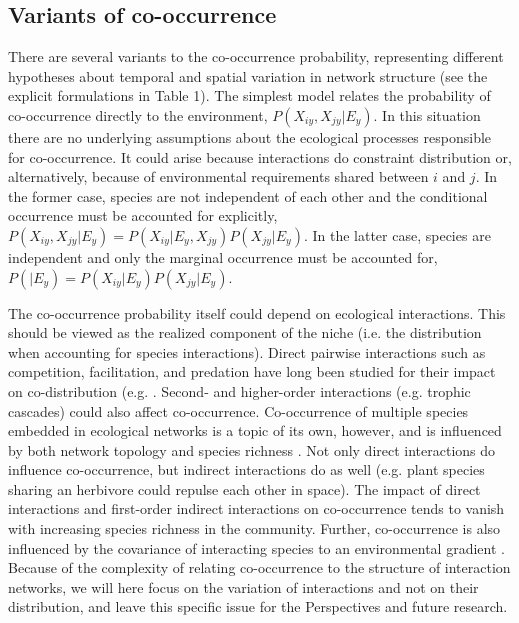 \documentclass[12pt]{article}
\begin{document}
\subsection*{Variants of co-occurrence}

There are several variants to the co-occurrence probability, representing
different hypotheses about temporal and spatial variation in network structure
(see the explicit formulations in Table 1). The simplest model relates the
probability of co-occurrence directly to the environment, $P(X_{iy},X_{jy}|E_y)$.
In this situation there are no underlying assumptions about the ecological
processes responsible for co-occurrence. It could arise because interactions
do constraint distribution \citep{Pollock2014, Cazelles2016} or,
alternatively, because of environmental requirements shared between $i$ and
$j$. In the former case, species are not independent of each other and the
conditional occurrence must be accounted for explicitly, $P(X_{iy},X_{jy}
|E_y)=P(X_{iy}|E_y,X_{jy})P(X_{jy}|E_y)$. In the latter case, species are
independent and only the marginal occurrence must be accounted for, $P(
|E_y)=P(X_{iy} |E_y)P(X_{jy} |E_y)$.

The co-occurrence probability itself could depend on ecological interactions.
This should be viewed as the realized component of the niche (i.e. the
distribution when accounting for species interactions). Direct pairwise
interactions such as competition, facilitation, and predation have long been
studied for their impact on co-distribution (e.g. \citealt{Diamond1976, Connor1980,
Gotelli2000}. Second- and higher-order interactions (e.g. trophic cascades)
could also affect co-occurrence. Co-occurrence of multiple species embedded in
ecological networks is a topic of its own, however, and is influenced by both network
topology and species richness \citep{Cazelles2016}. Not only direct interactions do
influence co-occurrence, but indirect interactions do as well (e.g. plant species
sharing an herbivore could repulse each other in space). The impact of direct
interactions and first-order indirect interactions on co-occurrence tends to
vanish with increasing species richness in the community. Further, co-occurrence
is also influenced by the covariance of interacting species to an
environmental gradient \citep{Cazelles2015}. Because of the complexity of relating
co-occurrence to the structure of interaction networks, we will here focus on
the variation of interactions and not on their distribution, and leave this
specific issue for the Perspectives and future research.
\end{document}
